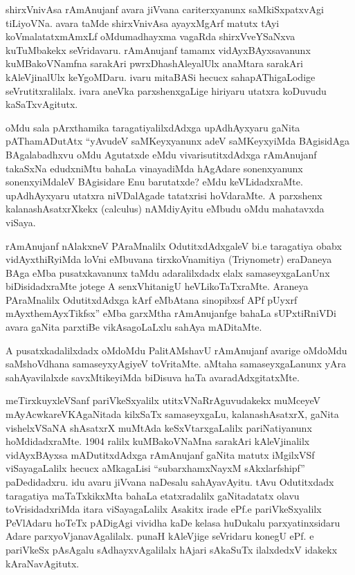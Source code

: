 shirxVnivAsa rAmAnujanf avara jiVvana cariterxyanunx saMkiSxpatxvAgi tiLiyoVNa. avara taMde shirxVnivAsa ayayxMgArf matutx tAyi koVmalatatxmAmxLf oMdu\break madhayxma vagaRda shirxVveYSaNxva kuTuMbakekx seVridavaru. rAmAnujanf tamamx vidAyxBAyxsavanunx kuMBa\-koVNamfna sarakAri pwrxDhashAleyalUlx anaMtara sarakAri kAleVjinalUlx keYgoMDaru. ivaru mitaBASi hecucx sahapAThigaLodige seVrutitxralilalx. ivara aneVka parxshenxgaLige hiriyaru utatxra koDuvudu kaSaTxvAgitutx.

oMdu sala pArxthamika taragatiyalilxdAdxga upAdhAyxyaru gaNita pATha\-mADutAtx ``yAvudeV saMKeyxyanunx adeV saMKeyxyiMda BAgisidAga BAgalabadhxvu oMdu Agutatxde eMdu vivarisutitxdAdxga rAmAnujanf takaSxNa edudxniMtu bahaLa vinayadiMda hAgA\-dare sonenxyanunx sonenxyiMdaleV BAgisidare Enu barutatxde? eMdu keVLidadxraMte. upAdhAyxyaru utatxra niVDalAgade tatatxrisi hoVdaraMte. A parxshenx kalanashAsatxrXkekx {\rm (calculus)} nAMdiyAyitu eMbudu oMdu mahatavxda viSaya. 

rAmAnujanf nAlakxneV PAraMnalilx OdutitxdAdxgaleV bi.e taragatiya obabx vidAyxthiR\-yiMda loVni eMbuvana tirxkoVnamitiya {\rm (Triynometr)} eraDaneya BAga eMba pusatxkavanunx taMdu adaralilxdadx elalx samaseyxgaLanUnx biDisidadxraMte jotege A senxVhita\-nigU heVLikoTaTxraMte. Araneya PAraMnalilx OdutitxdAdxga kArf eMbAtana sinopibxsf APf pUyxrf mAyxthemAyxTikfsx'' eMba garxMtha rAmAnujanfge bahaLa sUPxtiRniVDi avara gaNita parxtiBe vikAsagoLaLxlu sahAya mADitaMte.

A pusatxkadalilxdadx oMdoMdu PalitAMshavU rAmAnujanf avarige oMdoMdu saMshoVdhana samaseyxyAgiyeV toVritaMte. aMtaha samaseyxgaLanunx yAra sahAya\-vilalxde savxMtikeyiMda biDisuva haTa avaradAdxgitatxMte.

meTirxkuyxleVSanf pariVkeSxyalilx utitxVNaRrAguvudakekx muMceyeV mAyAcwka\break reVKAgaNitada kilxSaTx samaseyxgaLu, kalanashAsatxrX, gaNita vishelxVSaNA shAsatxrX muMtAda keSxVtarxgaLalilx pariNatiyanunx hoMdidadxraMte. {\rm 1904} ralilx kuMBakoVNaMna sarakAri kAleVjinalilx vidAyxBAyxsa mADutitxdAdxga rAmAnujanf gaNita matutx iMgilxVSf viSayagaLalilx hecucx aMkagaLisi ``subarxhamxNayxM sAkxlarfshipf'' paDedidadxru. idu avaru jiVvana naDesalu sahAyavAyitu. tAvu Odutitxdadx taragatiya maTaTxkikxMta bahaLa etatxradalilx gaNita\-datatx olavu toVrisidadxriMda itara viSayagaLalilx Asakitx irade ePf.e pariVkeSxyalilx PeVlAdaru hoTeTx pADigAgi vividha kaDe kelasa huDukalu parxyatinxsidaru Adare parxyoV\-janavAgalilalx. punaH kAleVjige seVridaru konegU ePf. e pariVkeSx pAsAgalu sAdhayxvAgalilalx hAjari sAkaSuTx ilalxdedxV idakekx kAraNavAgitutx.

